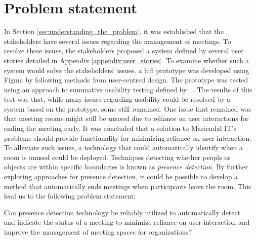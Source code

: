 \section{Problem statement}\label{sec:problem_statement}
In Section \ref{sec:understanding_the_problem}, it was established that the stakeholders have several issues regarding the management of meetings. 
To resolve these issues, the stakeholders proposed a system defined by several user stories detailed in Appendix \ref{appendix:user_stories}. 
To examine whether such a system would solve the stakeholders' issues, a hifi prototype was developed using Figma\cite{Figma} by following methods from user-centred design.
The prototype was tested using an approach to summative usability testing defined by \citeauthor{lazar2005web}~\cite{lazar2005web}. 
The results of this test was that, while many issues regarding usability could be resolved by a system based on the prototype, some still remained. 
One issue that remained was that meeting rooms might still be unused due to reliance on user interactions for ending the meeting early.
It was concluded that a solution to Mariendal IT's problems should provide functionality for minimizing reliance on user interaction.
To alleviate such issues, a technology that could automatically identify when a room is unused could be deployed. 
Techniques detecting whether people or objects are within specific boundaries is known as \textit{presence detection}.
By further exploring approaches for presence detection, it could be possible to develop a method that automatically ends meetings when participants leave the room.
This lead us to the following problem statement:
\begin{problem_statement}
    Can presence detection technology be reliably utilized to automatically detect and indicate the status of a meeting to minimize reliance on user interaction and improve the management of meeting spaces for organizations? 
\end{problem_statement}

